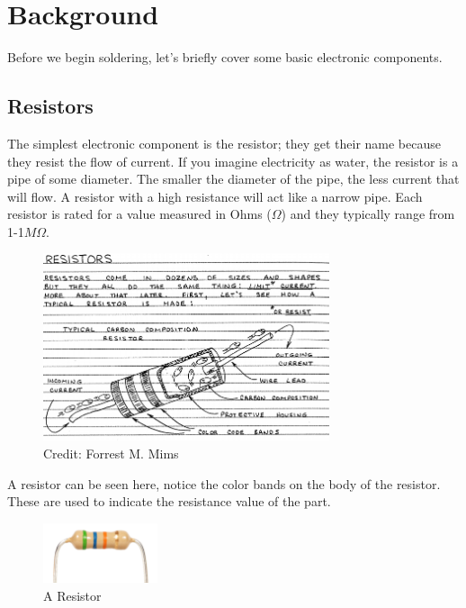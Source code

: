 \documentclass{article}
\begin{document}
    
  
  
      
      
      \clearpage
      \newpage
      \newpage
      
  
              \section{Background}
  
    Before we begin soldering, let's briefly cover some basic electronic components.
    
                    \subsection{Resistors}
  
      The simplest electronic component is the resistor; they get their name because they resist
      the flow of current. If you imagine electricity as water, the resistor is a pipe of some diameter.
      The smaller the diameter of the pipe, the less current that will flow. A resistor with a high resistance will act like
      a narrow pipe. Each resistor is rated for a value measured in Ohms ($\Omega$) and they typically range from 1-1$M\Omega$.
      
\begin{figure}[H]
\caption{ Credit: Forrest M. Mims }
\label{fig:img/resistor.png}
\centering
\includegraphics[width=0.75\textwidth]{img/resistor.png}
\end{figure}

      A resistor can be seen here, notice the color bands on the body of the resistor. These are used
      to indicate the resistance value of the part.
      
\begin{figure}[H]
\caption{ A Resistor }
\label{fig:img/resistorirl.jpg}
\centering
\includegraphics[width=0.3\textwidth]{img/resistorirl.jpg}
\end{figure}
\end{document}
